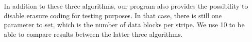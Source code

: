 In addition to these three algorithms, our program also provides the possibility to disable erasure coding for testing purposes.
In that case, there is still one parameter to set, which is the number of data blocks per stripe.
We use 10 to be able to compare results between the latter three algorithms.





